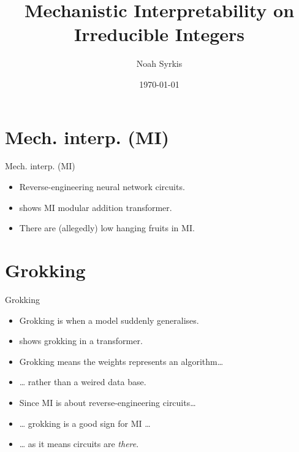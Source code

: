 \documentclass[aspectratio=32]{beamer}
\title{Mechanistic Interpretability on Irreducible Integers}
\date{\mydate\today}
\author{Noah Syrkis}
\providecommand{\tightlist}{\setlength{\itemsep}{0pt}\setlength{\parskip}{0pt}}
\begin{document}
  \begin{frame}[allowframebreaks]
    \titlepage
  \end{frame}

  \section{\textbar{} Mech. interp. (MI)}\label{mech.-interp.-mi}

  \begin{frame}[allowframebreaks]{\textbar{} Mech. interp. (MI)}
  \begin{itemize}
  \tightlist
  \item
    Reverse-engineering neural network circuits.
  \item
    \textcite{nanda2023} shows MI modular addition transformer.
  \item
    There are (allegedly) low hanging fruits in MI.
  \end{itemize}
  \end{frame}

  \section{\textbar{} Grokking}\label{grokking}

  \begin{frame}[allowframebreaks]{\textbar{} Grokking}
  \begin{itemize}
  \tightlist
  \item
    Grokking is when a model suddenly generalises.
  \item
    \textcite{nanda2023} shows grokking in a transformer.
  \item
    Grokking means the weights represents an algorithm\ldots{}
  \item
    \ldots{} rather than a weired data base.
  \end{itemize}

  \framebreak

  \begin{itemize}
  \tightlist
  \item
    Since MI is about reverse-engineering circuits\ldots{}
  \item
    \ldots{} grokking is a good sign for MI \ldots{}
  \item
    \ldots{} as it means circuits are \emph{there}.
  \end{itemize}
  \end{frame}
\end{document}
